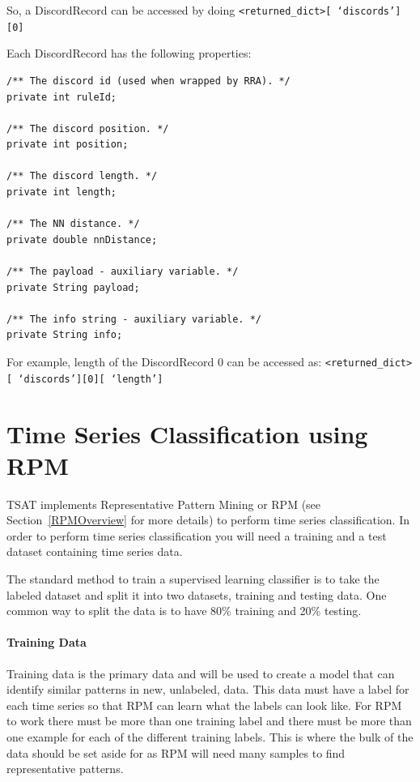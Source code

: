 \documentclass[titlepage, letterpaper, 12pt]{article}
\def\bsq#1{%
	\lq{#1}\rq}
\begin{document}
So, a DiscordRecord can be accessed by doing 
\texttt{<returned\_dict>[\bsq{discords}][0]}

Each DiscordRecord has the following properties:
\begin{lstlisting}
/** The discord id (used when wrapped by RRA). */
private int ruleId;

/** The discord position. */
private int position;

/** The discord length. */
private int length;

/** The NN distance. */
private double nnDistance;

/** The payload - auxiliary variable. */
private String payload;

/** The info string - auxiliary variable. */
private String info;

\end{lstlisting}

For example, length of the DiscordRecord 0 can be accessed as:
\texttt{<returned\_dict>[\bsq{discords}][0][\bsq{length}]}


\section{Time Series Classification using RPM}
\label{ClassGuide}
TSAT implements Representative Pattern Mining or RPM  (see Section~\ref{RPMOverview} for more details) to perform time series classification.  In order to perform time series classification you will need a training and a test dataset containing time series data.

The standard method to train a supervised learning classifier is to take the labeled dataset and split it into two datasets, training and testing data.  One common way to split the data is to have 80\% training and 20\% testing.  

\paragraph{Training Data}
Training data is the primary data and will be used to create a model that can identify similar patterns in new, unlabeled, data. This data must have a label for each time series so that RPM can learn what the labels can look like.  For RPM to work there must be more than one training label and there must be more than one example for each of the different training labels. This is where the bulk of the data should be set aside for as RPM will need many samples to find representative patterns.
\end{document}

